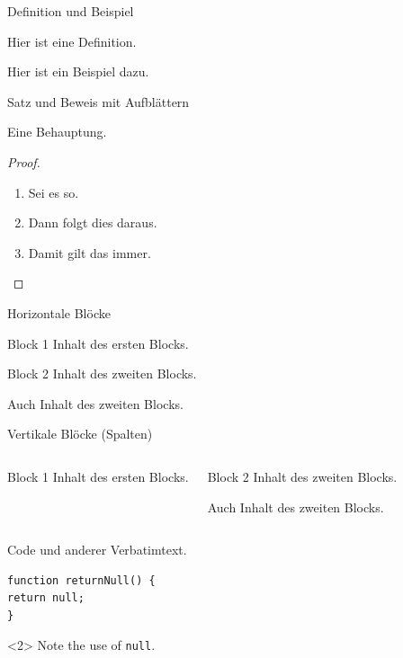 	\begin{frame}{Definition und Beispiel}
		\begin{definition}
			Hier ist eine Definition.
		\end{definition}
		\begin{example}
			Hier ist ein Beispiel dazu.
		\end{example}
	\end{frame}

	\begin{frame}{Satz und Beweis mit Aufblättern}
		\begin{theorem}
			Eine Behauptung.
		\end{theorem}
		\begin{proof}
			\begin{enumerate}
				\item<1-> Sei es so.
				\item<2-> Dann folgt dies daraus.
				\item<1-> Damit gilt das immer.\qedhere
			\end{enumerate}
		\end{proof}
	\end{frame}

	\begin{frame}{Horizontale Blöcke}
		\begin{block}{Block 1}
			Inhalt des ersten Blocks.
		\end{block}
		\begin{block}{Block 2}
			Inhalt des zweiten Blocks.

			Auch Inhalt des zweiten Blocks.
		\end{block}
	\end{frame}

	\begin{frame}{Vertikale Blöcke (Spalten)}
		\begin{columns}
				\begin{block}{Block 1}
					Inhalt des ersten Blocks.
				\end{block}
				\begin{block}{Block 2}
					Inhalt des zweiten Blocks.

					Auch Inhalt des zweiten Blocks.
				\end{block}
		\end{columns}
	\end{frame}

\begin{frame}[fragile]{Code und anderer Verbatimtext.}
\begin{verbatim}
function returnNull() {
return null;
}
\end{verbatim}
\begin{uncoverenv}<2>
Note the use of \verb|null|.
\end{uncoverenv}
\end{frame}

